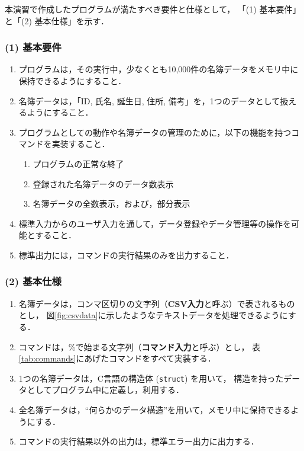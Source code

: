 \documentclass[autodetect-engine,dvi=dvipdfmx,ja=standard,
               a4j,11pt]{bxjsarticle}
\begin{document}
本演習で作成したプログラムが満たすべき要件と仕様として，
「(1) 基本要件」と「(2) 基本仕様」を示す．

\subsubsection*{(1) 基本要件}

\begin{enumerate}
  \setlength{\parskip}{0em} \setlength{\itemsep}{0.25em}
    \item プログラムは，その実行中，少なくとも10,000件の名簿データをメモリ中に保持できるようにすること．
    \item 名簿データは，「ID, 氏名, 誕生日, 住所, 備考」を，1つのデータとして扱えるようにすること．
    \item プログラムとしての動作や名簿データの管理のために，以下の機能を持つコマンドを実装すること．
    \begin{enumerate} \setlength{\parskip}{0em} \setlength{\itemsep}{0.25em}
        \item プログラムの正常な終了
        \item 登録された名簿データのデータ数表示
        \item 名簿データの全数表示，および，部分表示
    \end{enumerate}
    \item 標準入力からのユーザ入力を通して，データ登録やデータ管理等の操作を可能とすること．
    \item 標準出力には，コマンドの実行結果のみを出力すること．
\end{enumerate}

\subsubsection*{(2) 基本仕様}

\begin{enumerate}
  \setlength{\parskip}{0em} \setlength{\itemsep}{0.25em}
    \item 名簿データは，コンマ区切りの文字列（\textbf{CSV入力}と呼ぶ）で表されるものとし，
          図\ref{fig:csvdata}に示したようなテキストデータを処理できるようにする．
    \item コマンドは，\%で始まる文字列（\textbf{コマンド入力}と呼ぶ）とし，
          表\ref{tab:commands}にあげたコマンドをすべて実装する．
    \item 1つの名簿データは，C言語の構造体 (\texttt{struct}) を用いて，
          構造を持ったデータとしてプログラム中に定義し，利用する．
    \item 全名簿データは，``何らかのデータ構造''を用いて，メモリ中に保持できるようにする．
    \item コマンドの実行結果以外の出力は，標準エラー出力に出力する．
\end{enumerate}
\end{document}
